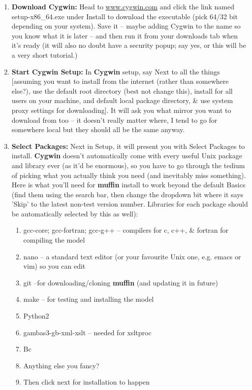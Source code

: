 \documentclass[11pt,fleqn]{book} %
\begin{document}
\begin{enumerate}[noitemsep]

\vspace{2mm}
\item \textbf{Download Cygwin:} Head to
  \href{https://www.cygwin.com/}{www.cygwin.com} and click the link
  named \textsf{\small setup-x86\_64.exe} under \textsf{\small
    Install} to download the executable (pick 64/32 bit depending on
  your system). Save it -- maybe adding \textsf{\small Cygwin} to the
  name so you know what it is later -- and then run it from your
  downloads tab when it’s ready (it will also no doubt have a security
  popup; say yes, or this will be a very short tutorial.)

\vspace{2mm}
\item \textbf{Start Cygwin Setup:} In \textbf{Cygwin} setup, say
  \textsf{\small Next} to all the things [assuming you want to install
    from the internet (rather than somewhere else?), use the default
    root directory (best not change this), install for all users on
    your machine, and default local package directory, \& use system
    proxy settings for downloading]. It will ask you what mirror you
  want to download from too – it doesn’t really matter where, I tend
  to go for somewhere local but they should all be the same anyway.

\vspace{2mm}
\item \textbf{Select Packages:} Next in Setup, it will present you
  with Select Packages to install. \textbf{Cygwin} doesn’t
  automatically come with every useful Unix package and library ever
  (as it’d be enormous), so you have to go through the tedium of
  picking what you actually think you need (and inevitably miss
  something). Here is what you’ll need for \textbf{muffin} install to
  work beyond the default Basics (find them using the search bar, then
  change the dropdown bit where it says 'Skip' to the latest non-test
  version number. Libraries for each package should be automatically
  selected by this as well):

\vspace{1mm}
\begin{enumerate}[noitemsep]
\item gcc-core; gcc-fortran; gcc-g++ – compilers for c, c++, \& fortran
  for compiling the model
\item nano – a standard text editor (or your favourite Unix one,
  e.g. emacs or vim) so you can edit
\item git –for downloading/cloning \textbf{muffin} (and updating it in
  future)
\item make – for testing and installing the model
\item Python2
\item gambas3-gb-xml-xslt – needed for xsltproc
\item Bc
\item Anything else you fancy?
\item Then click next for installation to happen
\end{enumerate}
\vspace{1mm}


\end{enumerate}
\end{document}
